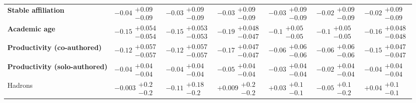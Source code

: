 \begin{table}[H]
\begin{tabular}{lllllll}
\textbf{Stable affiliation} & $-0.04\substack{+0.09 \\ -0.09}$ & $-0.03\substack{+0.09 \\ -0.09}$ & $-0.03\substack{+0.09 \\ -0.09}$ & $-0.03\substack{+0.09 \\ -0.09}$ & $-0.02\substack{+0.09 \\ -0.09}$ & $-0.02\substack{+0.09 \\ -0.09}$ \\
\textbf{Academic age} & $\bm{-0.15}\substack{+0.054 \\ -0.054}$ & $\bm{-0.15}\substack{+0.053 \\ -0.053}$ & $\bm{-0.19}\substack{+0.048 \\ -0.047}$ & $\bm{-0.1}\substack{+0.05 \\ -0.05}$ & $\bm{-0.1}\substack{+0.05 \\ -0.05}$ & $\bm{-0.16}\substack{+0.048 \\ -0.048}$ \\
\textbf{Productivity (co-authored)} & $\bm{-0.12}\substack{+0.057 \\ -0.057}$ & $\bm{-0.12}\substack{+0.057 \\ -0.057}$ & $\bm{-0.17}\substack{+0.047 \\ -0.047}$ & $\bm{-0.06}\substack{+0.06 \\ -0.06}$ & $\bm{-0.06}\substack{+0.06 \\ -0.06}$ & $\bm{-0.15}\substack{+0.047 \\ -0.047}$ \\
\textbf{Productivity (solo-authored)} & $\bm{-0.04}\substack{+0.04 \\ -0.04}$ & $-0.04\substack{+0.04 \\ -0.04}$ & $\bm{-0.05}\substack{+0.04 \\ -0.04}$ & $-0.03\substack{+0.04 \\ -0.04}$ & $-0.02\substack{+0.04 \\ -0.04}$ & $-0.04\substack{+0.04 \\ -0.04}$ \\
\hline Hadrons & $-0.003\substack{+0.2 \\ -0.2}$ & $-0.11\substack{+0.18 \\ -0.2}$ & $+0.009\substack{+0.2 \\ -0.2}$ & $+0.03\substack{+0.1 \\ -0.1}$ & $-0.05\substack{+0.1 \\ -0.2}$ & $+0.04\substack{+0.1 \\ -0.1}$ \\

\end{tabular}
\end{table}

